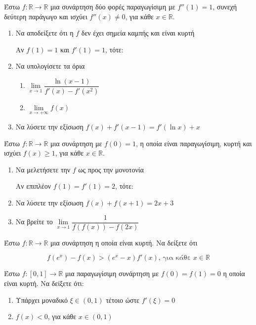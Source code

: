 \documentclass{../presentation}
\begin{document}
\begin{askisi}
  Έστω $f:\mathbb{R}\to\mathbb{R}$ μια συνάρτηση δύο φορές παραγωγίσιμη με $f''(1)=1$, συνεχή δεύτερη παράγωγο και ισχύει $f''(x)\ne 0$, για κάθε $x\in\mathbb{R}$.
  \begin{enumerate}[<+->]
    \item Να αποδείξετε ότι η $f$ δεν έχει σημεία καμπής και είναι κυρτή

          Αν $f(1)=1$ και $f'(1)=1$, τότε:

    \item Να υπολογίσετε τα όρια
          \begin{enumerate}[<+->]
            \item $\lim\limits_{x\to 1}\dfrac{\ln(x-1)}{f'(x)-f'(x^2)}$
            \item $\lim\limits_{x\to +\infty}f(x)$
          \end{enumerate}

    \item Να λύσετε την εξίσωση $f(x)+f'(x-1)=f'(\ln x)+x$
  \end{enumerate}
\end{askisi}

\begin{askisi}
  Έστω $f:\mathbb{R}\to\mathbb{R}$ μια συνάρτηση με $f(0)=1$, η οποία είναι παραγωγίσιμη, κυρτή και ισχύει $f(x)\ge 1$, για κάθε $x\in\mathbb{R}$.
  \begin{enumerate}[<+->]
    \item Να μελετήσετε την $f$ ως προς την μονοτονία

          Αν επιπλέον $f(1)=f'(1)=2$, τότε:

    \item Να λύσετε την εξίσωση $f(x)+f(x+1)=2x+3$
    \item Να βρείτε το $\lim\limits_{x\to 1}\dfrac{1}{f\left( f(x)\right)-f(2x)}$
  \end{enumerate}
\end{askisi}

\begin{askisi}
  Έστω $f:\mathbb{R}\to\mathbb{R}$ μια συνάρτηση η οποία είναι κυρτή. Να δείξετε ότι

  $$f(e^x)-f(x)>(e^x-x)f'(x) \text{, για κάθε } x\in\mathbb{R}$$
\end{askisi}

\begin{askisi}
  Έστω $f:[0,1]\to\mathbb{R}$ μια παραγωγίσιμη συνάρτηση με $f(0)=f(1)=0$ η οποία είναι κυρτή. Να δείξετε ότι:
  \begin{enumerate}[<+->]
    \item Υπάρχει μοναδικό $ξ\in(0,1)$ τέτοιο ώστε $f'(ξ)=0$
    \item $f(x)<0$, για κάθε $x\in(0,1)$
  \end{enumerate}
\end{askisi}
\end{document}
